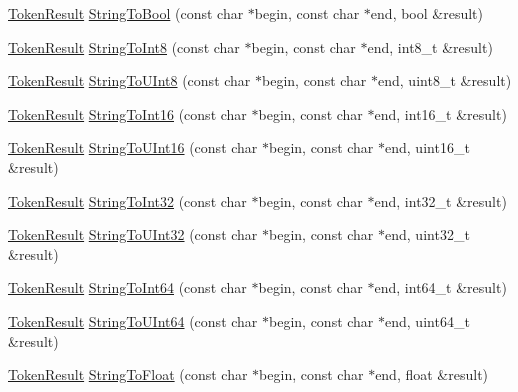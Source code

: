 \begin{DoxyCompactItemize}
\item 
\hyperlink{namespacemage_a2178ba2411db5912f41b2e7698c2037d}{Token\+Result} \hyperlink{namespacemage_a5deef7799d080b8c98c9ead54fbcb6db}{String\+To\+Bool} (const char $\ast$begin, const char $\ast$end, bool \&result)
\item 
\hyperlink{namespacemage_a2178ba2411db5912f41b2e7698c2037d}{Token\+Result} \hyperlink{namespacemage_a0bd81bf259563dd9de793ada42405c95}{String\+To\+Int8} (const char $\ast$begin, const char $\ast$end, int8\+\_\+t \&result)
\item 
\hyperlink{namespacemage_a2178ba2411db5912f41b2e7698c2037d}{Token\+Result} \hyperlink{namespacemage_ae6af1c0b282e0858fe4376325b4d06c6}{String\+To\+U\+Int8} (const char $\ast$begin, const char $\ast$end, uint8\+\_\+t \&result)
\item 
\hyperlink{namespacemage_a2178ba2411db5912f41b2e7698c2037d}{Token\+Result} \hyperlink{namespacemage_aa993ba23b5023902c29ecbe9b0d7a954}{String\+To\+Int16} (const char $\ast$begin, const char $\ast$end, int16\+\_\+t \&result)
\item 
\hyperlink{namespacemage_a2178ba2411db5912f41b2e7698c2037d}{Token\+Result} \hyperlink{namespacemage_a12bd34f17d7d39ac8d054be9293efe54}{String\+To\+U\+Int16} (const char $\ast$begin, const char $\ast$end, uint16\+\_\+t \&result)
\item 
\hyperlink{namespacemage_a2178ba2411db5912f41b2e7698c2037d}{Token\+Result} \hyperlink{namespacemage_a011b7977a7ae88795aac61e0e921bffe}{String\+To\+Int32} (const char $\ast$begin, const char $\ast$end, int32\+\_\+t \&result)
\item 
\hyperlink{namespacemage_a2178ba2411db5912f41b2e7698c2037d}{Token\+Result} \hyperlink{namespacemage_ad84d36f8aaa4376d26b79a2fbd8fe22a}{String\+To\+U\+Int32} (const char $\ast$begin, const char $\ast$end, uint32\+\_\+t \&result)
\item 
\hyperlink{namespacemage_a2178ba2411db5912f41b2e7698c2037d}{Token\+Result} \hyperlink{namespacemage_a1e044f5c734c6597945b775100c45086}{String\+To\+Int64} (const char $\ast$begin, const char $\ast$end, int64\+\_\+t \&result)
\item 
\hyperlink{namespacemage_a2178ba2411db5912f41b2e7698c2037d}{Token\+Result} \hyperlink{namespacemage_a8e3b6a19a6ab9e7c905150352b8ab0ea}{String\+To\+U\+Int64} (const char $\ast$begin, const char $\ast$end, uint64\+\_\+t \&result)
\item 
\hyperlink{namespacemage_a2178ba2411db5912f41b2e7698c2037d}{Token\+Result} \hyperlink{namespacemage_a8610747ad641d27135bcd3a3d3c6b6c2}{String\+To\+Float} (const char $\ast$begin, const char $\ast$end, float \&result)

\end{DoxyCompactItemize}

